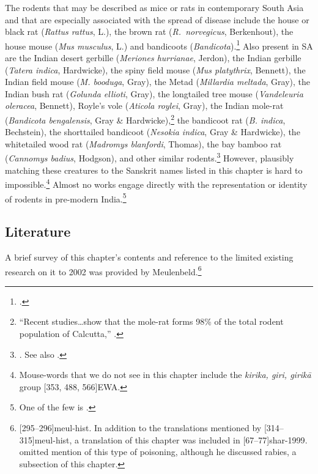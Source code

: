 The rodents that may be described as mice or rats in contemporary
South Asia and that are especially associated with the spread of
disease include the house or black rat (\emph{Rattus rattus}, L.),
the brown rat (\emph{R.\ norvegicus}, Berkenhout), the house mouse
(\emph{Mus musculus}, L.) and bandicoots
(\emph{Bandicota}).\footcite[194]{bia} Also present in SA are the
Indian desert gerbille (\emph{Meriones hurrianae}, Jerdon), the
Indian gerbille (\emph{Tatera indica}, Hardwicke), the spiny field
mouse (\emph{Mus platythrix}, Bennett), the Indian field mouse
(\emph{M. booduga}, Gray), the Metad (\emph{Millardia meltada},
Gray), the Indian bush rat (\emph{Golunda ellioti}, Gray), the
longtailed tree mouse (\emph{Vandeleuria oleracea}, Bennett), Royle's
vole (\emph{Aticola roylei}, Gray), the Indian mole-rat
(\emph{Bandicota bengalensis}, Gray \& Hardwicke),\footnote{“Recent
    studies\ldots show that the mole-rat forms 98\% of the total rodent
    population of Calcutta,” \cite[206]{bia}.} the bandicoot rat
    (\emph{B. indica}, Bechstein), the shorttailed bandicoot
    (\emph{Nesokia indica}, Gray \& Hardwicke), the whitetailed wood rat
    (\emph{Madromys blanfordi}, Thomas), the bay bamboo rat
    (\emph{Cannomys badius}, Hodgson), and other similar
    rodents.\footnote{\cite[ill.\ plates \,45, 46 \emph{et passim}]{bia}.
        See also \cite[passim]{meno-2014}.} However, plausibly matching
        these creatures to the Sanskrit names listed in this chapter is hard
        to impossible.\footnote{Mouse-words that we do not see in this
            chapter include the \emph{kirika, giri, girikā} group
            [353, 488, 566]{EWA}.}  Almost no works engage directly
            with the representation or identity of rodents in pre-modern
            India.\footnote{One of the few is \cite[ch.\,3]{geer-2008}.}



\subsection{Literature}

A brief survey of this chapter's contents and reference to the
limited existing research on it to 2002 was provided by
Meulenbeld.\footnote{[295--296]{meul-hist}. In addition
    to the translations mentioned by [314--315]{meul-hist},
    a translation of this chapter was included in
    [67--77]{shar-1999}. \citet{sekh-2023} omitted mention of
    this type of poisoning, although he discussed rabies, a subsection of
    this chapter.}
    

